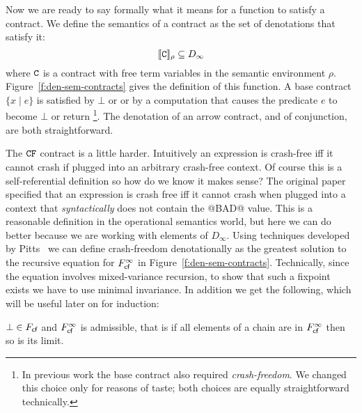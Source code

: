 Now we are ready to say formally what it means for a function to satisfy a contract.
We define the semantics of a contract as the set of denotations that satisfy it:
\[              [\![{\tt C}]\!]_\rho \subseteq D_\infty  \]
where ${\tt C}$ is a contract with free term variables in the semantic environment $\rho$.
Figure~\ref{f:den-sem-contracts} gives the definition of this function.
A base contract $\{x \mid e\}$ is satisfied by $\bot$ or
or by a computation that causes the predicate $e$ to become $\bot$
or return \True\footnote{
In previous
work \cite{xu+:contracts} the base contract also
required {\em crash-freedom}.
We changed this choice only for reasons of taste; both choices
are equally straightforward technically.}.
The denotation of an arrow contract, and of conjunction, are both straightforward.

The ${\tt CF}$ contract is a little harder. Intuitively an expression is crash-free iff it cannot
crash if plugged into an arbitrary crash-free context. Of course this is a
self-referential definition so how do we know it makes sense? The original paper
\cite{xu+:contracts} specified that an expression is crash free iff it
cannot crash when plugged into a context that {\em syntactically} does not contain the
@BAD@ value. This is a reasonable definition in the operational semantics world, but
here we can do better because we are working with elements of $D_\infty$. Using
techniques developed by Pitts~\cite{pitts-rel-domains} we can define crash-freedom denotationally as the greatest solution
to the recursive equation for $F_{\textsf{cf}}^{\infty}$ in Figure~\ref{f:den-sem-contracts}. Technically,
since the equation involves mixed-variance recursion, to show that such a fixpoint exists we have
to use minimal invariance.
In addition we get the following, which will be useful later on for induction:
\begin{lemma}\label{lem:cf-admissible}
$\bot \in F_{\textsf{cf}}$ and $F_{\textsf{cf}}^{\infty}$ is admissible, that is if all elements of a chain are in
$F_{\textsf{cf}}^{\infty}$ then so is its limit.
\end{lemma}

